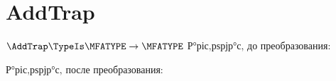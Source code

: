 \section{AddTrap}
\begin{frame}{$\AddTrap\TypeIs\MFATYPE\to\MFATYPE$}
	Р°ріс‚рѕрјр°с‚ до преобразования:

	Р°ріс‚рѕрјр°с‚ после преобразования:
\end{frame}